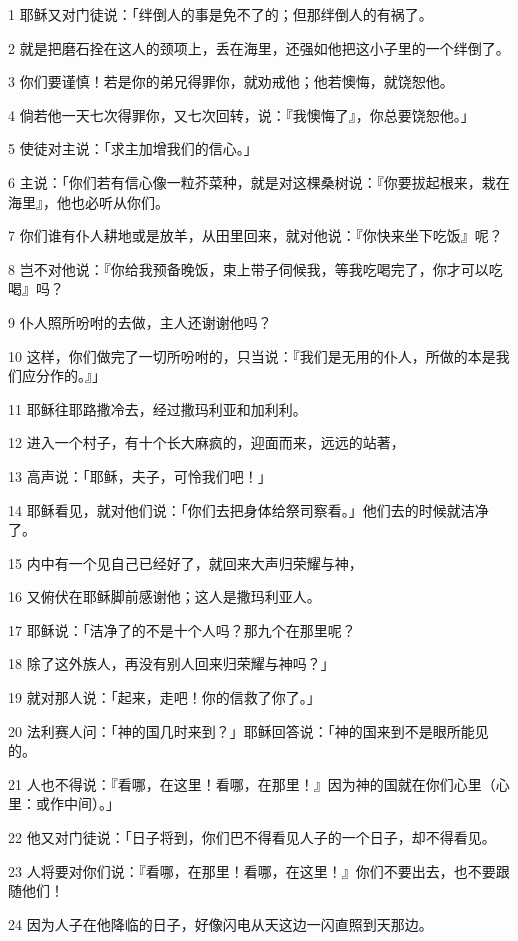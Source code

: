 \par 1 耶稣又对门徒说：「绊倒人的事是免不了的；但那绊倒人的有祸了。
\par 2 就是把磨石拴在这人的颈项上，丢在海里，还强如他把这小子里的一个绊倒了。
\par 3 你们要谨慎！若是你的弟兄得罪你，就劝戒他；他若懊悔，就饶恕他。
\par 4 倘若他一天七次得罪你，又七次回转，说：『我懊悔了』，你总要饶恕他。」
\par 5 使徒对主说：「求主加增我们的信心。」
\par 6 主说：「你们若有信心像一粒芥菜种，就是对这棵桑树说：『你要拔起根来，栽在海里』，他也必听从你们。
\par 7 你们谁有仆人耕地或是放羊，从田里回来，就对他说：『你快来坐下吃饭』呢？
\par 8 岂不对他说：『你给我预备晚饭，束上带子伺候我，等我吃喝完了，你才可以吃喝』吗？
\par 9 仆人照所吩咐的去做，主人还谢谢他吗？
\par 10 这样，你们做完了一切所吩咐的，只当说：『我们是无用的仆人，所做的本是我们应分作的。』」
\par 11 耶稣往耶路撒冷去，经过撒玛利亚和加利利。
\par 12 进入一个村子，有十个长大麻疯的，迎面而来，远远的站著，
\par 13 高声说：「耶稣，夫子，可怜我们吧！」
\par 14 耶稣看见，就对他们说：「你们去把身体给祭司察看。」他们去的时候就洁净了。
\par 15 内中有一个见自己已经好了，就回来大声归荣耀与神，
\par 16 又俯伏在耶稣脚前感谢他；这人是撒玛利亚人。
\par 17 耶稣说：「洁净了的不是十个人吗？那九个在那里呢？
\par 18 除了这外族人，再没有别人回来归荣耀与神吗？」
\par 19 就对那人说：「起来，走吧！你的信救了你了。」
\par 20 法利赛人问：「神的国几时来到？」耶稣回答说：「神的国来到不是眼所能见的。
\par 21 人也不得说：『看哪，在这里！看哪，在那里！』因为神的国就在你们心里（心里：或作中间）。」
\par 22 他又对门徒说：「日子将到，你们巴不得看见人子的一个日子，却不得看见。
\par 23 人将要对你们说：『看哪，在那里！看哪，在这里！』你们不要出去，也不要跟随他们！
\par 24 因为人子在他降临的日子，好像闪电从天这边一闪直照到天那边。
